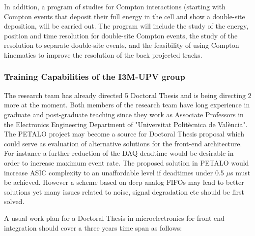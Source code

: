 In addition, a program of studies for Compton interactions (starting with Compton events that deposit their full energy in the cell and show a double-site deposition, will be carried out. The program will include the study of the energy, position and time resolution for double-site Compton events, the study of the resolution to separate double-site events, and the feasibility of using Compton kinematics to improve the resolution of the back projected tracks. 


\subsubsection*{Training Capabilities of the I3M-UPV group}
\par The research team has already directed 5 Doctoral Thesis and is being directing 2 more at the moment. Both members of the research team have long experience in graduate and post-graduate teaching since they work as Associate Professors in the Electronics Engineering Department of "Universitat Politècnica de València". The PETALO project may become a source for Doctoral Thesis proposal which could serve as evaluation of alternative solutions for the front-end architecture. For instance a further reduction of the DAQ deadtime would be desirable in order to increase maximum event rate. The proposed solution in PETALO would increase ASIC complexity to an unaffordable level if deadtimes under 0.5 $\mu$s must be achieved. However a scheme based on deep analog FIFOs may lead to better solutions yet many issues related to noise, signal degradation etc should be first solved.
\par A usual work plan for a Doctoral Thesis in microelectronics for front-end integration should cover a three years time span as follows:
